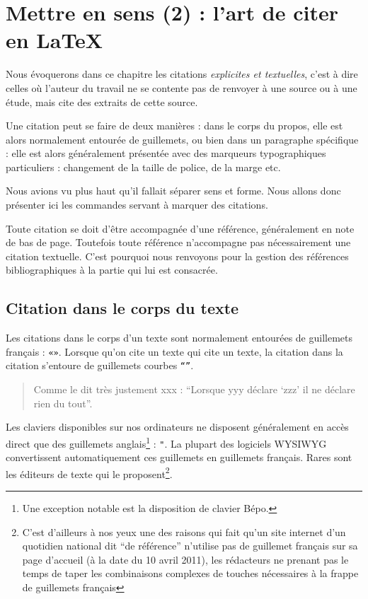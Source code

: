 \chapter{Mettre en sens (2) : l'art de citer en LaTeX}\label{citertexte}

\begin{prealable}
Nous évoquerons dans ce chapitre les citations \emph{explicites et textuelles}, c'est à dire celles où l'auteur du travail ne se contente pas de renvoyer à une source ou à une étude, mais cite des extraits de cette source.

Une citation peut se faire de deux manières : dans le corps du propos, elle est alors normalement entourée de guillemets, ou bien dans un paragraphe spécifique : elle est alors généralement présentée avec des marqueurs typographiques particuliers : changement de la taille de police, de la marge etc.

Nous avions vu plus haut qu'il fallait séparer sens et forme. Nous allons donc présenter ici les commandes servant à marquer des citations.

\end{prealable}
\begin{attention}
Toute citation se doit d'être accompagnée d'une référence, généralement en note de bas de page. Toutefois toute référence n'accompagne pas nécessairement une citation textuelle. C'est pourquoi nous renvoyons pour la gestion des références bibliographiques à la partie qui lui est consacrée.

\end{attention}

\section{Citation dans le corps du texte}\label{guillemets}

Les citations dans le corps d'un texte sont normalement entourées de guillemets français : \verb|«»|. Lorsque qu'on cite un texte qui cite un texte, la citation dans la citation s'entoure de guillemets courbes \verb|“”|. 

\begin{quotation}
	Comme le dit très justement xxx : \enquote{Lorsque yyy déclare \enquote{zzz} il ne déclare rien du tout}.
\end{quotation}

Les claviers disponibles sur nos ordinateurs ne disposent généralement en accès direct que des guillemets anglais\footnote{Une exception notable est la disposition de clavier Bépo.} : \verb|"|. 
La plupart des logiciels WYSIWYG convertissent automatiquement ces guillemets en guillemets français. Rares sont les éditeurs de texte qui le proposent\footnote{C'est d'ailleurs à nos yeux une des raisons qui fait qu'un site internet d'un quotidien national dit \enquote{de référence} n'utilise pas de guillemet français sur sa page d'accueil (à la date du 10 avril 2011), les rédacteurs ne prenant pas le temps de taper les combinaisons complexes de touches nécessaires à la frappe de guillemets français}. 

